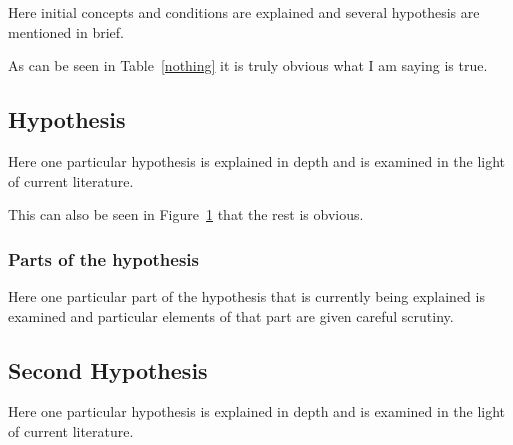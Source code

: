 \documentclass[11pt]{isuthesis}
\begin{document}
Here initial concepts and conditions are explained and
several hypothesis are mentioned in brief.

As can be seen in Table~\ref{nothing} it is truly
obvious what I am saying is true.

\begin{table}[h!tb] \centering
{}
\label{nothing}

\vspace{ 2 in}
\end{table}

\subsection{Hypothesis}

Here one particular hypothesis is explained in depth
and is examined in the light of current literature.

This can also be seen in Figure~\ref{moon} that the
rest is obvious.

\begin{figure}[h!tb] \centering

\vspace{ 2 in}
\label{moon}
\end{figure}

\subsubsection{Parts of the hypothesis}

Here one particular part of the hypothesis that is 
currently being explained is examined and particular
elements of that part are given careful scrutiny.


\subsection{Second Hypothesis}

Here one particular hypothesis is explained in depth
and is examined in the light of current literature.
\end{document}
